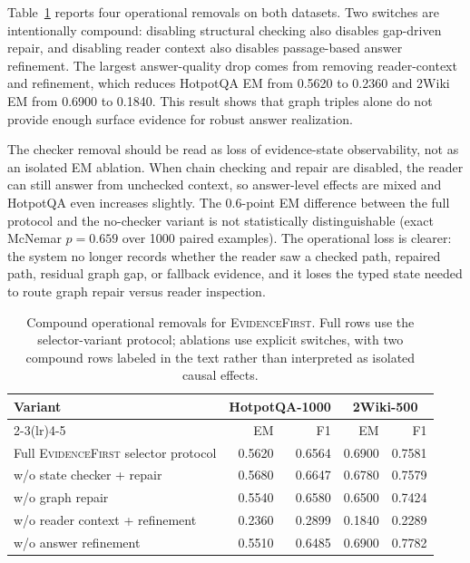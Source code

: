 \documentclass[runningheads,a4paper]{llncs}
\newcommand{\sys}{\textsc{EvidenceFirst}\xspace}
\begin{document}
Table~\ref{tab:ablations} reports four operational removals on both datasets.
Two switches are intentionally compound: disabling structural checking also
disables gap-driven repair, and disabling reader context also disables
passage-based answer refinement. The largest answer-quality drop comes from
removing reader-context and refinement, which reduces HotpotQA EM from 0.5620 to
0.2360 and 2Wiki EM from 0.6900 to 0.1840. This result shows that graph triples
alone do not provide enough surface evidence for robust answer realization.

The checker removal should be read as loss of evidence-state observability, not
as an isolated EM ablation. When chain checking and repair are disabled, the
reader can still answer from unchecked context, so answer-level effects are
mixed and HotpotQA even increases slightly. The 0.6-point EM difference between
the full protocol and the no-checker variant is not statistically distinguishable
(exact McNemar $p=0.659$ over 1000 paired examples). The operational loss is
clearer: the system no longer records whether the reader saw a checked path,
repaired path, residual graph gap, or fallback evidence, and it loses the typed
state needed to route graph repair versus reader inspection.

\begin{table}[!htbp]
\centering
\caption{Compound operational removals for \sys. Full rows use the
selector-variant protocol; ablations use explicit switches, with two compound
rows labeled in the text rather than interpreted as isolated causal effects.}
\label{tab:ablations}
\small
\setlength{\tabcolsep}{4.0pt}
\begin{tabular}{lrrrr}
\toprule
\multirow{2}{*}{Variant} & \multicolumn{2}{c}{HotpotQA-1000} & \multicolumn{2}{c}{2Wiki-500} \\
\cmidrule(lr){2-3}\cmidrule(lr){4-5}
 & EM & F1 & EM & F1 \\
\midrule
Full \sys selector protocol & 0.5620 & 0.6564 & 0.6900 & 0.7581 \\
w/o state checker + repair & 0.5680 & 0.6647 & 0.6780 & 0.7579 \\
w/o graph repair & 0.5540 & 0.6580 & 0.6500 & 0.7424 \\
w/o reader context + refinement & 0.2360 & 0.2899 & 0.1840 & 0.2289 \\
w/o answer refinement & 0.5510 & 0.6485 & 0.6900 & 0.7782 \\
\bottomrule
\end{tabular}
\end{table}
\end{document}
